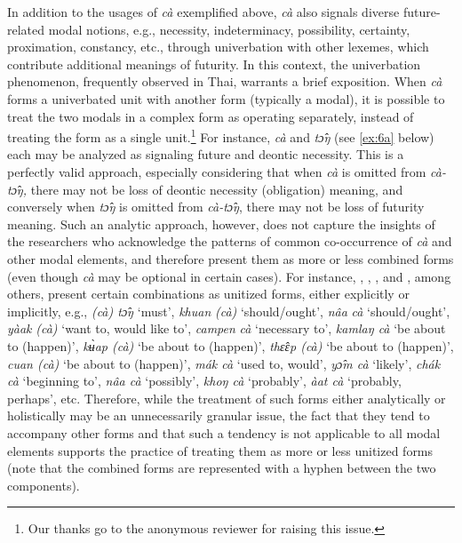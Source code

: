 \documentclass[output=paper,colorlinks,citecolor=brown]{langscibook}
\begin{document}
In addition to the usages of \textit{cà} exemplified above, \textit{cà} also signals diverse future-related modal notions, e.g., necessity, indeterminacy, possibility, certainty, proximation, constancy, etc., through univerbation with other lexemes, which contribute additional meanings of futurity. In this context, the univerbation phenomenon, frequently observed in Thai, warrants a brief exposition. When \textit{cà }forms a univerbated unit with another form (typically a modal), it is possible to treat the two modals in a complex form as operating separately, instead of treating the form as a single unit.\footnote{Our thanks go to the anonymous reviewer for raising this issue.} For instance, \textit{cà }and \textit{tɔ̂ŋ }(see \ref{ex:6a} below) each may be analyzed as signaling future and deontic necessity. This is a perfectly valid approach, especially considering that when \textit{cà }is omitted from \textit{cà-tɔ̂ŋ, }there may not be loss of deontic necessity (obligation) meaning, and conversely when \textit{tɔ̂ŋ }is omitted from \textit{cà-tɔ̂ŋ}, there may not be loss of futurity meaning. Such an analytic approach, however, does not capture the insights of the researchers who acknowledge the patterns of common co-occurrence of \textit{cà }and other modal elements, and therefore present them as more or less combined forms (even though \textit{cà }may be optional in certain cases). For instance, \citet[117]{Noss1964}, \citet[65--69]{Smyth2002}, \citet[130--134]{IwasakiIngkaphirom2005}, and \citet[58]{Soithurum2010}, among others, present certain combinations as unitized forms, either explicitly or implicitly, e.g., \textit{(cà) tɔ̂ŋ} ‘must’, \textit{khuan} \textit{(cà) }‘should/ought’, \textit{nâa} \textit{cà} ‘should/ought’, \textit{yàak} \textit{(cà)} ‘want to, would like to’, \textit{campen} \textit{cà }‘necessary to’, \textit{kamlaŋ cà} ‘be about to (happen)’, \textit{kʉ̀ap (cà)} ‘be about to (happen)’, \textit{thɛ̂ɛp (cà)} ‘be about to (happen)’, \textit{cuan (cà)} ‘be about to (happen)’, \textit{mák cà} ‘used to, would’, \textit{yɔ̂m cà} ‘likely’, \textit{chák cà} ‘beginning to’, \textit{nâa cà} ‘possibly’, \textit{khoŋ cà} ‘probably’, \textit{àat cà} ‘probably, perhaps’, etc. Therefore, while the treatment of such forms either analytically or holistically may be an unnecessarily granular issue, the fact that they tend to accompany other forms and that such a tendency is not applicable to all modal elements supports the practice of treating them as more or less unitized forms (note that the combined forms are represented with a hyphen between the two components). 
\end{document}
